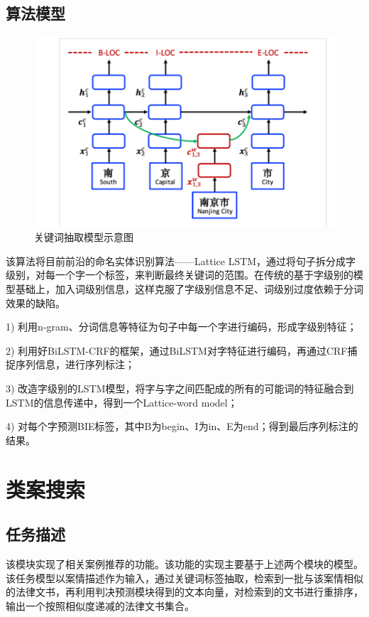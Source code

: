 \subsection{算法模型}

\begin{figure}[ht]
    \centering
    \includegraphics[width=\linewidth]{figures/model2}
    \caption{关键词抽取模型示意图}
    \label{fig:model2}
\end{figure}

该算法将目前前沿的命名实体识别算法——Lattice LSTM，通过将句子拆分成字级别，对每一个字一个标签，来判断最终关键词的范围。在传统的基于字级别的模型基础上，加入词级别信息，这样克服了字级别信息不足、词级别过度依赖于分词效果的缺陷。

1)	利用n-gram、分词信息等特征为句子中每一个字进行编码，形成字级别特征；

2)	利用好BiLSTM-CRF的框架，通过BiLSTM对字特征进行编码，再通过CRF捕捉序列信息，进行序列标注；

3)	改造字级别的LSTM模型，将字与字之间匹配成的所有的可能词的特征融合到LSTM的信息传递中，得到一个Lattice-word model；

4)	对每个字预测BIE标签，其中B为begin、I为in、E为end；得到最后序列标注的结果。



\section{类案搜索}
\subsection{任务描述}
该模块实现了相关案例推荐的功能。该功能的实现主要基于上述两个模块的模型。该任务模型以案情描述作为输入，通过关键词标签抽取，检索到一批与该案情相似的法律文书，再利用判决预测模块得到的文本向量，对检索到的文书进行重排序，输出一个按照相似度递减的法律文书集合。

